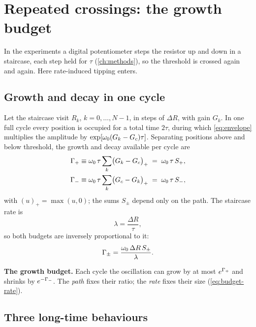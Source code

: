 \section{Repeated crossings: the growth budget}\label{sec:budget}

In the experiments a digital potentiometer steps the resistor up and down in a staircase, each step held
for $\tau$ (\cref{ch:methods}), so the threshold is crossed again and again. Here rate-induced tipping
enters.

\subsection{Growth and decay in one cycle}

Let the staircase visit $R_{k}$, $k=0,\dots,N-1$, in steps of $\Delta R$, with gain $G_{k}$. In one full
cycle every position is occupied for a total time $2\tau$, during which \cref{eq:envelope} multiplies the
amplitude by $\exp[\omega_{0}(G_{k}-G_{c})\tau]$. Separating positions above and below threshold, the growth and
decay available per cycle are
\begin{align}
  \Gamma_{+} &\equiv \omega_{0}\,\tau\sum_{k}\bigl(G_{k}-G_{c}\bigr)_{+} \;=\; \omega_{0}\,\tau\,S_{+} ,
  \label{eq:Gp}\\
  \Gamma_{-} &\equiv \omega_{0}\,\tau\sum_{k}\bigl(G_{c}-G_{k}\bigr)_{+} \;=\; \omega_{0}\,\tau\,S_{-} ,
  \label{eq:Gm}
\end{align}
with $(u)_{+}=\max(u,0)$; the sums $S_{\pm}$ depend only on the path. The staircase rate is
\begin{equation}
  \lambda = \frac{\Delta R}{\tau} ,
  \label{eq:lambda-stair}
\end{equation}
so both budgets are inversely proportional to it:
\begin{equation}
  \Gamma_{\pm} = \frac{\omega_{0}\,\Delta R\,S_{\pm}}{\lambda} .
  \label{eq:budget-rate}
\end{equation}

\begin{keybox}
\textbf{The growth budget.} Each cycle the oscillation can grow by at most $e^{\Gamma_{+}}$ and shrinks by
$e^{-\Gamma_{-}}$. The \emph{path} fixes their ratio; the \emph{rate} fixes their size (\cref{eq:budget-rate}).
\end{keybox}

\subsection{Three long-time behaviours}

